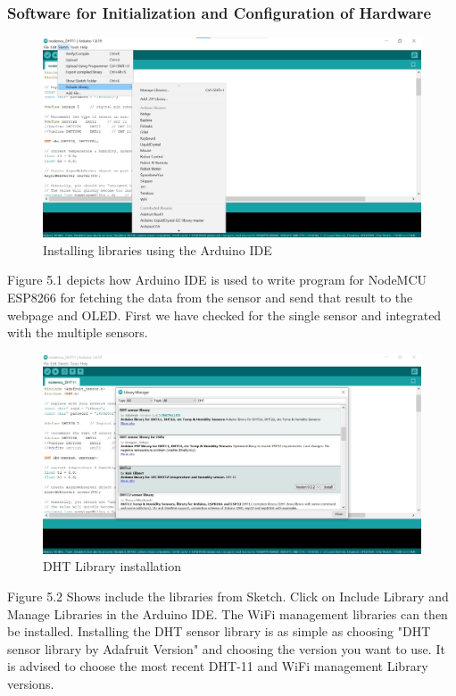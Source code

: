 \documentclass[12pt,a4paper,twocolumn,fleqn]{article}
\begin{document}
\subsubsection{Software for Initialization and Configuration of Hardware }
\begin{figure} [H]
\includegraphics[width=17cm]{media/lib (2).jpeg}
\centering
\caption{Installing libraries using the Arduino IDE}
\end{figure} 
Figure 5.1 depicts how Arduino IDE is used to write program for NodeMCU ESP8266 for fetching the data from the sensor and send that result to the webpage and OLED. First we have checked for the single sensor and integrated with the multiple sensors.
\begin{figure} [H]
\includegraphics[width=17cm]{media/lib (1).jpeg}
\centering
\caption{DHT Library installation }
\end{figure}
Figure 5.2 Shows include the libraries from Sketch. Click on Include Library and Manage Libraries in the Arduino IDE. The WiFi management libraries can then be installed. Installing the DHT sensor library is as simple as choosing "DHT sensor library by Adafruit Version" and choosing the version you want to use. It is advised to choose the most recent DHT-11 and WiFi management Library versions.
\end{document}
